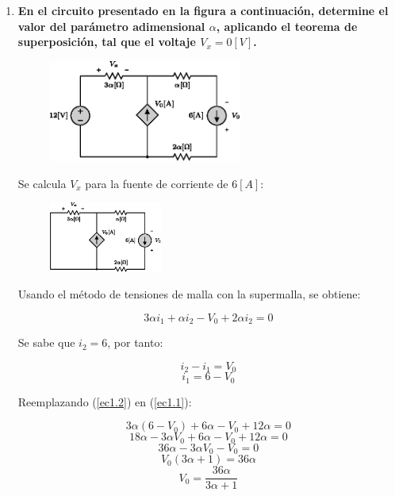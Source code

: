 \documentclass[letter,11pt]{article}
\begin{document}
\begin{enumerate}

\item \textbf{En el circuito presentado en la figura a continuación, determine
el valor del parámetro adimensional $\alpha$, aplicando el teorema de
superposición, tal que el voltaje $V_x = 0 [V]$.}

\begin{figure}[!h]
\centering
\includegraphics[width=0.6\textwidth]{resources/figura1.eps}
\end{figure}

Se calcula $V_x$ para la fuente de corriente de $6[A]$:

\begin{figure}[!h]
\centering
\includegraphics[width=0.35\textwidth]{resources/figura2.eps}
\end{figure}

Usando el método de tensiones de malla con la supermalla, se obtiene:

\begin{equation}
    3\alpha i_1 + \alpha i_2 - V_0 + 2\alpha i_2 = 0
    \label{ec1.1}
\end{equation}

Se sabe que $i_2 = 6$, por tanto:

\begin{equation*}
    i_2 - i_1 = V_0
\end{equation*}
\begin{equation}
    i_1 = 6 - V_0
    \label{ec1.2}
\end{equation}

Reemplazando (\ref{ec1.2}) en (\ref{ec1.1}):

\begin{equation*}
    3\alpha (6 - V_0) + 6 \alpha - V_0 + 12\alpha = 0
\end{equation*}
\begin{equation*}
    18\alpha - 3\alpha V_0 + 6 \alpha - V_0 + 12\alpha = 0
\end{equation*}
\begin{equation*}
    36\alpha - 3\alpha V_0 - V_0 = 0
\end{equation*}
\begin{equation*}
    V_0 (3\alpha + 1) = 36\alpha
\end{equation*}
\begin{equation}
    V_0 = \frac{36\alpha}{3\alpha + 1}
    \label{ec1.3}
\end{equation}


\end{enumerate}
\end{document}
